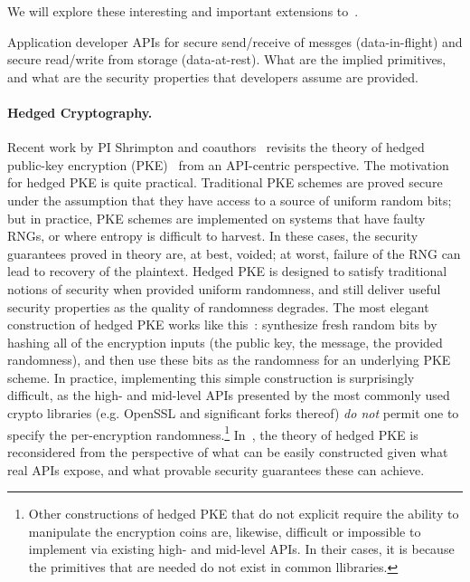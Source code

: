 \begin{task}
  We will explore these interesting and important extensions to~\cite{SSW}.
\end{task}
%

\begin{task}
Application developer APIs for secure send/receive of messges
(data-in-flight) and secure read/write from storage (data-at-rest).  What are
the implied primitives, and what are the security properties that developers
assume are provided.
\end{task}

\paragraph{Hedged Cryptography. }
Recent work by PI Shrimpton and coauthors~\cite{BPS} revisits the theory of
hedged public-key encryption (PKE)~\cite{BBN+} from an API-centric perspective.
%
The motivation for hedged PKE is quite practical. Traditional PKE schemes are
proved secure under the assumption that they have access to a source of uniform
random bits; but in practice, PKE schemes are implemented on systems that have
faulty RNGs, or where entropy is difficult to harvest.  In these cases, the
security guarantees proved in theory are, at best, voided; at worst, failure of
the RNG can lead to recovery of the plaintext.
%
Hedged PKE is designed to satisfy traditional notions of security when provided
uniform randomness, and still deliver useful security properties as the quality
of randomness degrades.  The most elegant construction of hedged PKE works like
this~\cite{BBN+,BH15}: synthesize fresh random bits by hashing all of the
encryption inputs (the public key, the message, the provided randomness), and
then use these bits as the randomness for an underlying PKE scheme.  In
practice, implementing this simple construction is surprisingly difficult, as
the high- and mid-level APIs presented by the most commonly used crypto
libraries (e.g. OpenSSL and significant forks thereof) \emph{do not} permit one
to specify the per-encryption randomness.\footnote{Other constructions of hedged
PKE that do not explicit require the ability to manipulate the encryption coins
are, likewise, difficult or impossible to implement via existing high- and
mid-level APIs.  In their cases, it is because the primitives that are needed do
not exist in common llibraries.}
In~\cite{BPS}, the theory of hedged
PKE is reconsidered from the perspective of what can be easily constructed given
what real APIs expose, and what provable security guarantees these can achieve.

